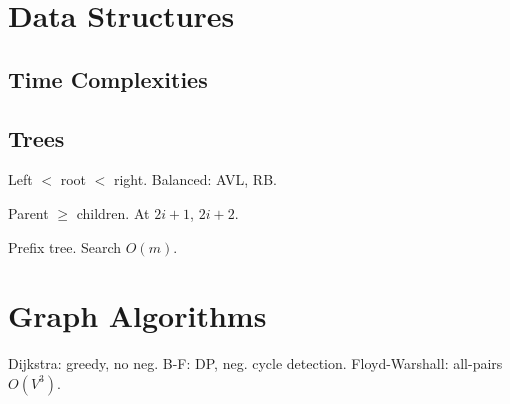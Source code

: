 \section{Data Structures}

\subsection{Time Complexities}

\subsection{Trees}
\begin{deflist}
  \item[BST] Left $<$ root $<$ right. Balanced: AVL, RB.
  \item[Heap] Parent $\geq$ children. At $2i{+}1$, $2i{+}2$.
  \item[Trie] Prefix tree. Search $O(m)$.
\end{deflist}

\section{Graph Algorithms}


\begin{thmbox}
Dijkstra: greedy, no neg.
B-F: DP, neg. cycle detection.
Floyd-Warshall: all-pairs $O(V^3)$.
\end{thmbox}
